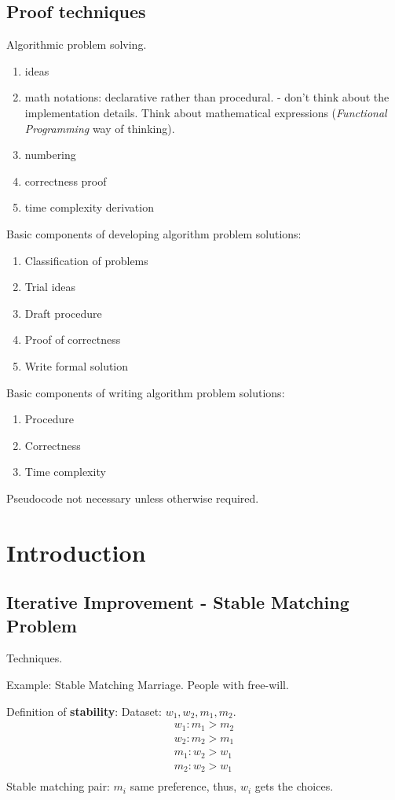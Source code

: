 \documentclass[a4paper]{report}
\theoremstyle{definition}
\begin{document}
\section*{Proof techniques}
Algorithmic problem solving.
\begin{enumerate}
\item ideas
\item math notations: declarative rather than procedural. - don't think about the implementation details. Think about mathematical expressions (\textit{Functional Programming} way of thinking).
\item numbering
\item correctness proof
\item time complexity derivation
\end{enumerate}
Basic components of developing algorithm problem solutions:
\begin{enumerate}
\item Classification of problems
\item Trial ideas
\item Draft procedure
\item Proof of correctness
\item Write formal solution
\end{enumerate}
Basic components of writing algorithm problem solutions:
\begin{enumerate}
\item Procedure
\item Correctness
\item Time complexity
\end{enumerate}

Pseudocode not necessary unless otherwise required. 

\chapter{Introduction}
\section{Iterative Improvement - Stable Matching Problem }
Techniques.

Example: Stable Matching Marriage. People with free-will.

Definition of \textbf{stability}:
Dataset: $w_1, w_2, m_1, m_2$.
\begin{align*}
w_1: m_1 > m_2\\
w_2: m_2 > m_1\\
m_1: w_2 > w_1\\
m_2: w_2 > w_1\\
\end{align*}
Stable matching pair: $m_i$ same preference, thus, $w_i$ gets the choices.
\end{document}

